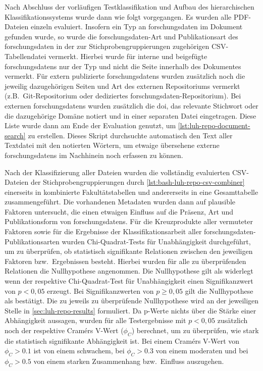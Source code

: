 Nach Abschluss der vorläufigen Testklassifikation und Aufbau des hierarchischen Klassifikationssystems wurde dann wie folgt vorgegangen.
Es wurden alle PDF-Dateien einzeln evaluiert.
Insofern ein Typ an \gls{forschungsdaten} im Dokument gefunden wurde, so wurde die \gls{forschungsdaten}-Art und Publikationsart des \gls{forschungsdaten} in der zur Stichprobengruppierungen zugehörigen CSV-Tabellendatei vermerkt.
Hierbei wurde für interne und beigefügte \glspl{forschungsdaten} nur der Typ und nicht die Seite innerhalb des Dokumentes vermerkt.
Für extern publizierte \glspl{forschungsdaten} wurden zusätzlich noch die jeweilig dazugehörigen Seiten und Art des externen Repositoriums vermerkt (z.B.~Git-Repositorium oder dediziertes \gls{forschungsdaten}-Repositorium).
Bei externen \glspl{forschungsdaten} wurden zusätzlich die \gls{doi}, das relevante Stichwort oder die dazugehörige Domäne notiert und in einer separaten Datei eingetragen.
Diese Liste wurde dann am Ende der Evaluation genutzt, um \cref{lst:luh-repo-document-search} zu erstellen.
Dieses Skript durchsuchte automatisch den Text aller Textdatei mit den notierten Wörtern, um etwaige übersehene externe \glspl{forschungsdaten} im Nachhinein noch erfassen zu können.

Nach der Klassifizierung aller Dateien wurden die vollständig evaluierten CSV-Dateien der Stichprobengruppierungen durch \cref{lst:bash-luh-repo-csv-combiner} einerseits in kombinierte Fakultätstabellen und andererseits in eine Gesamttabelle zusammengeführt.
Die vorhandenen Metadaten wurden dann auf plausible Faktoren untersucht, die einen etwaigen Einfluss auf die Präsenz, Art und Publikationsform von \glspl{forschungsdaten}.
Für die Kreuzprodukte aller vermuteter Faktoren sowie für die Ergebnisse der Klassifikationsarbeit aller \gls{forschungsdaten}-Publikationsarten wurden Chi-Quadrat-Tests für Unabhängigkeit durchgeführt, um zu überprüfen, ob statistisch signifikante Relationen zwischen den jeweiligen Faktoren bzw.~Ergebnissen besteht.
Hierbei wurden für alle zu überprüfenden Relationen die Nullhypothese angenommen.
Die Nullhypothese gilt als widerlegt wenn der respektive Chi-Quadrat-Test für Unabhängigkeit einen Signifikanzwert von $p<0,05$ erzeugt.
Bei Signifikanzwerten von $p\geqslant0,05$ gilt die Nullhypothese als bestätigt.
Die zu jeweils zu überprüfende Nullhypothese wird an der jeweiligen Stelle in \cref{sec:luh-repo-results} formuliert.
Da p-Werte nichts über die Stärke einer Abhängigkeit aussagen, wurden für alle Testergebnisse mit $p<0,05$ zusätzlich noch der respektive Cramérs V-Wert ($\phi_C$) berechnet, um zu überprüfen, wie stark die statistisch signifikante Abhängigkeit ist.
Bei einem Cramérs V-Wert von $\phi_C>\num{0,1}$ ist von einem schwachem, bei $\phi_C>\num{0,3}$ von einem moderaten und bei $\phi_C>\num{0,5}$ von einem starken Zusammenhang bzw.~Einfluss auszugehen.

